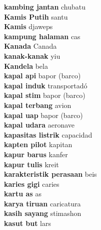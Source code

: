 \textbf{ kambing jantan  } chubatu \\
\textbf{ Kamis Putih  } santu \\
\textbf{ Kamis  } djaweps \\
\textbf{ kampung halaman  } cas \\
\textbf{ Kanada  } Canada \\
\textbf{ kanak-kanak  } yiu \\
\textbf{ Kandela  } bela \\
\textbf{ kapal api  } bapor (barco) \\
\textbf{ kapal induk  } transportadó \\
\textbf{ kapal stim  } bapor (barco) \\
\textbf{ kapal terbang  } avion \\
\textbf{ kapal uap  } bapor (barco) \\
\textbf{ kapal udara  } aeronave \\
\textbf{ kapasitas listrik  } capacidad \\
\textbf{ kapten pilot  } kapitan \\
\textbf{ kapur barus  } kanfer \\
\textbf{ kapur tulis  } kreit \\
\textbf{ karakteristik perasaan  } beis \\
\textbf{ karies gigi  } caries \\
\textbf{ kartu as  } as \\
\textbf{ karya tiruan  } caricatura \\
\textbf{ kasih sayang  } stimashon \\
\textbf{ kasut but  } lars \\
